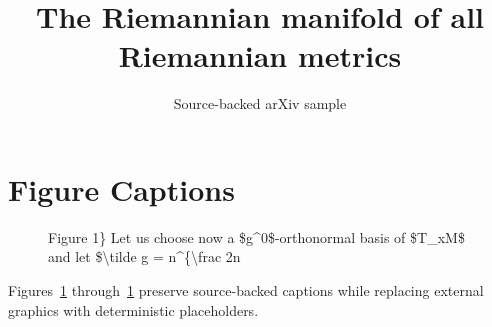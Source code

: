 \documentclass[11pt]{article}
\title{The Riemannian manifold of all Riemannian metrics}
\author{Source-backed arXiv sample}
\date{}
\begin{document}
\maketitle
\section{Figure Captions}

\begin{figure}[htbp]
\centering
\fbox{\rule{0pt}{1.15in}\rule{0.78\linewidth}{0pt}}
\caption{Figure 1\} Let us choose now a \$g\textasciicircum{}0\$-orthonormal basis of \$T\_xM\$ and let \$\textbackslash{}tilde g = n\textasciicircum{}\{\textbackslash{}frac 2n}
\label{fig:source-1}
\end{figure}


Figures~\ref{fig:source-1} through~\ref{fig:source-1} preserve source-backed captions while replacing external graphics with deterministic placeholders.
\end{document}
